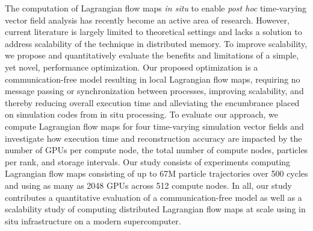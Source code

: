 The computation of Lagrangian flow maps \textit{in situ} to enable \textit{post hoc} time-varying vector field analysis has recently become an active area of research. 
%
However, current literature is largely limited to theoretical settings and lacks a solution to address scalability of the technique in distributed memory.
%
To improve scalability, we propose and quantitatively evaluate the benefits and limitations of a simple, yet novel, performance optimization.
%
Our proposed optimization is a communication-free model resulting in local Lagrangian flow maps, requiring no message passing or synchronization between processes, improving scalability, and thereby reducing overall execution time and alleviating the encumbrance placed on simulation codes from in situ processing.
%
To evaluate our approach, we compute Lagrangian flow maps for four time-varying simulation vector fields and investigate how execution time and reconstruction accuracy are impacted by the number of GPUs per compute node, the total number of compute nodes, particles per rank, and storage intervals. 
%
Our study consists of experiments computing Lagrangian flow maps consisting of up to 67M particle trajectories over 500 cycles and using as many as 2048 GPUs across 512 compute nodes.
%
In all, our study contributes a quantitative evaluation of a communication-free model as well as a scalability study of computing distributed Lagrangian flow maps at scale using in situ infrastructure on a modern supercomputer. 
%
